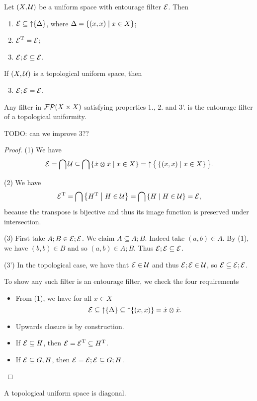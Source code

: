 \begin{lemma}
Let $\left( X,\mathcal{U} \right)$ be a uniform space with entourage filter $\operatorname{\mathcal{E}}$. Then
\begin{enumerate}
\item $\operatorname{\mathcal{E}}\subseteq \operatorname{\uparrow}\{\Delta\}$, where $\Delta = \left\{ (x,x) \;\middle|\; x\in X \right\}$;
\item $\operatorname{\mathcal{E}}^{\mathrm{T}} = \operatorname{\mathcal{E}}$;
\item $\operatorname{\mathcal{E}};\operatorname{\mathcal{E}} \subseteq \operatorname{\mathcal{E}}$.
\end{enumerate}
If $\left( X,\mathcal{U} \right)$ is a topological uniform space, then
\begin{enumerate}[1'.] \setcounter{enumi}{2}
\item $\operatorname{\mathcal{E}};\operatorname{\mathcal{E}} = \operatorname{\mathcal{E}}$.
\end{enumerate}
Any filter in $\operatorname{\mathcal{FP}}(X\times X)$ satisfying properties 1., 2. and 3'. is the entourage filter of a topological uniformity.
\end{lemma}
TODO: can we improve 3??
\begin{proof}
(1) We have
\[ \operatorname{\mathcal{E}} = \bigcap \mathcal{U} \subseteq \bigcap \left\{ \dot{x}\otimes \dot{x} \;\middle|\; x\in X \right\} = \operatorname{\uparrow}\big\{\left\{ (x,x) \;\middle|\; x\in X \right\}\big\}. \]

(2) We have
\[ \operatorname{\mathcal{E}}^{\mathrm{T}} = \bigcap \left\{ H^{\mathrm{T}} \;\middle|\; H\in\mathcal{U} \right\} = \bigcap \left\{ H \;\middle|\; H\in\mathcal{U} \right\} = \operatorname{\mathcal{E}}, \]
because the transpose is bijective and thus its image function is preserved under intersection.

(3) First take $A;B \in\operatorname{\mathcal{E}};\operatorname{\mathcal{E}}$. We claim $A\subseteq A;B$. Indeed take $(a,b)\in A$. By (1), we have $(b,b)\in B$ and so $(a,b)\in A;B$. Thus $\operatorname{\mathcal{E}};\operatorname{\mathcal{E}} \subseteq \operatorname{\mathcal{E}}$.

(3') In the topological case, we have that $\operatorname{\mathcal{E}}\in\mathcal{U}$ and thus $\operatorname{\mathcal{E}};\operatorname{\mathcal{E}}\in \mathcal{U}$, so $\operatorname{\mathcal{E}} \subseteq \operatorname{\mathcal{E}};\operatorname{\mathcal{E}}$.

To show any such filter is an entourage filter, we check the four requirements
\begin{itemize}
\item From (1), we have for all $x\in X$
\[ \operatorname{\mathcal{E}} \subseteq \operatorname{\uparrow}\{\Delta\} \subseteq \operatorname{\uparrow}\{(x,x)\} = \dot{x}\otimes\dot{x}. \]
\item Upwards closure is by construction.
\item If $\operatorname{\mathcal{E}} \subseteq H$, then $\operatorname{\mathcal{E}} = \operatorname{\mathcal{E}}^{\mathrm{T}} \subseteq H^{\mathrm{T}}$.
\item If $\operatorname{\mathcal{E}}\subseteq G,H$, then $\operatorname{\mathcal{E}} = \operatorname{\mathcal{E}};\operatorname{\mathcal{E}} \subseteq G;H$.
\end{itemize}
\end{proof}
\begin{corollary}
A topological uniform space is diagonal.
\end{corollary}

